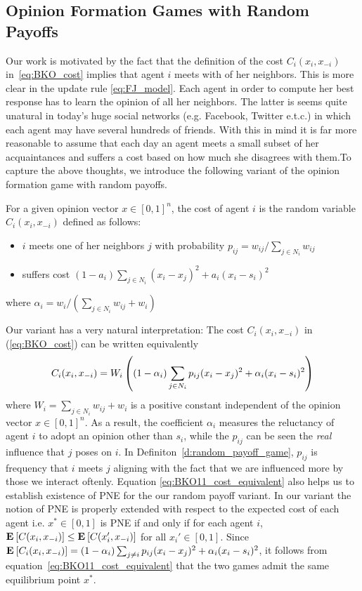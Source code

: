 \subsection{Opinion Formation Games with Random Payoffs}
Our work is motivated by the fact that the definition of the cost $C_i(x_i,x_{-i})$
in~\ref{eq:BKO_cost} implies that agent $i$ meets with of her neighbors. This is more
clear in the update rule \ref{eq:FJ_model}. Each agent in order to compute her best response
has to learn the opinion of all her neighbors. The latter is seems quite unatural in today's
huge social networks (e.g. Facebook, Twitter e.t.c.) in which each agent may have
several hundreds of friends. With this in mind it is far more reasonable to assume
that each day an agent meets a small subset of her acquaintances and
suffers a cost based on how much she disagrees with them.To capture the above thoughts,
we introduce the following variant of the opinion formation game with random
payoffs.

\begin{definition}\label{d:random_payoff_game}
  For a given opinion vector $x \in [0,1]^n$, the cost of agent $i$
  is the random variable $C_i(x_i,x_{-i})$ defined as follows:
  \begin{itemize}
    \item $i$ meets one of her neighbors $j$ with probability $p_{ij}= w_{ij}/\sum_{j\in N_i}w_{ij}$
    \item suffers cost $(1-a_i)\sum_{j \in N_i}(x_i-x_j)^2 + a_i(x_i-s_i)^2$
  \end{itemize}
  where $\alpha_i = w_i/(\sum_{j\in N_i}w_{ij}+w_i)$
\end{definition}
\noindent Our variant has a very natural interpretation: The cost $C_i(x_i,x_{-i})$ in (\ref{eq:BKO_cost})
can be written equivalently
\begin{equation}\label{eq:BKO11_cost_equivalent}
C_i(x_i,x_{-i}) = W_i\left( (1-\alpha_i)\sum_{j \in N_i} p_{ij}(x_i-x_j)^2  + \alpha_i(x_i-s_i)^2\right)
\end{equation}
where $W_i=\sum_{j\in N_i}w_{ij} + w_i$ is a positive constant independent of the opinion vector $x\in [0,1]^n$. As a result, the coefficient $\alpha_i$
measures the reluctancy of agent $i$ to adopt an opinion other than $s_i$, while the $p_{ij}$ can be seen the \emph{real} influence that $j$ poses on $i$.
In Definiton~\ref{d:random_payoff_game}, $p_{ij}$ is frequency that $i$ meets $j$ aligning with the fact that we are influenced more by those we interact
oftenly. Equation \ref{eq:BKO11_cost_equivalent} also helps us to establish existence of PNE for the our random payoff variant.
In our variant the notion of PNE is properly extended with respect to the expected cost of each agent i.e. $x^* \in [0,1]$ is PNE if and only if
for each agent $i$, $\Exp{C(x_i, x_{-i})} \leq \Exp{C(x_i', x_{-i})}$ for all $x_i' \in [0,1]$. Since
$\bm{\mathrm{E}}_{} \left[ C_i(x_i,x_{-i}) \right]=(1-\alpha_i)\sum_{j \neq i}p_{ij}(x_i-x_j)^2 + \alpha_i(x_i-s_i)^2$, it follows
from equation~\ref{eq:BKO11_cost_equivalent} that the two games admit the same equilibrium point $x^*$.

